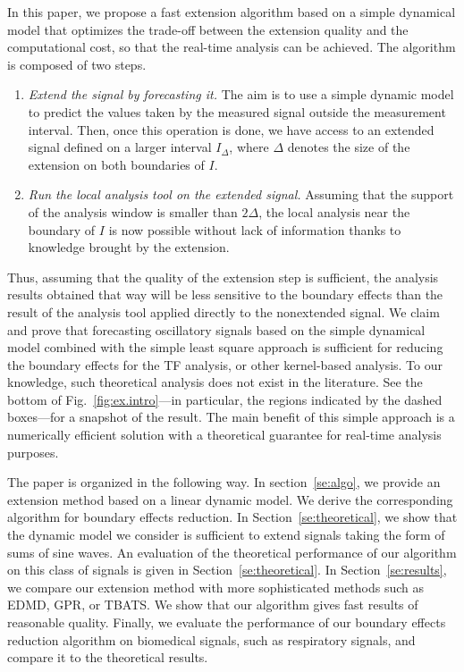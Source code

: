 \documentclass[journal]{IEEEtran}
\begin{document}
In this paper, we propose a fast extension algorithm based on a simple dynamical model that optimizes the trade-off between the extension quality and the computational cost, so that the real-time analysis can be achieved. The algorithm is composed of two steps.
\begin{enumerate}
\item \emph{Extend the signal by forecasting it.} The aim is to use a simple dynamic model to predict the values taken by the measured signal outside the measurement interval. Then, once this operation is done, we have access to an extended signal defined on a larger interval $I_\Delta$, where $\Delta$ denotes the size of the extension on both boundaries of $I$.
\item \emph{Run the local analysis tool on the extended signal.} Assuming that the support of the analysis window is smaller than $2\Delta$, the local analysis near the boundary of $I$ is now possible without lack of information thanks to knowledge brought by the extension. 
\end{enumerate}

Thus, assuming that the quality of the extension step is sufficient, the analysis results obtained that way will be less sensitive to the boundary effects than the result of the analysis tool applied directly to the nonextended signal. We claim and prove that forecasting oscillatory signals based on the simple dynamical model combined with the simple least square approach is sufficient for reducing the boundary effects for the TF analysis, or other kernel-based analysis. To our knowledge, such theoretical analysis does not exist in the literature. See the bottom of Fig.~\ref{fig:ex.intro}---in particular, the regions indicated by the dashed boxes---for a snapshot of the result. The main benefit of this simple approach is a numerically efficient solution with a theoretical guarantee for real-time analysis purposes. 

The paper is organized in the following way. In section~\ref{se:algo}, we provide an extension method based on a linear dynamic model. We derive the corresponding algorithm for boundary effects reduction. In Section~\ref{se:theoretical}, we show that the dynamic model we consider is sufficient to extend signals taking the form of sums of sine waves. An evaluation of the theoretical performance of our algorithm on this class of signals is given in Section~\ref{se:theoretical}. In Section~\ref{se:results}, we compare our extension method with more sophisticated methods such as EDMD, GPR, or TBATS. We show that our algorithm gives fast results of reasonable quality. Finally, we evaluate the performance of our boundary effects reduction algorithm on biomedical signals, such as respiratory signals, and compare it to the theoretical results. 
\end{document}
